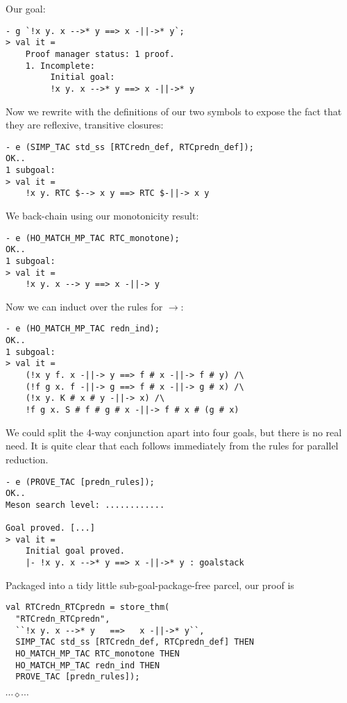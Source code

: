 \documentclass[12pt]{article}
\newcommand{\eos}{\hfill{}$\cdots\diamond\cdots$\hfill{}\vspace{5mm}}
\begin{document}
Our goal:
\begin{session}\begin{verbatim}
- g `!x y. x -->* y ==> x -||->* y`;
> val it =
    Proof manager status: 1 proof.
    1. Incomplete:
         Initial goal:
         !x y. x -->* y ==> x -||->* y
\end{verbatim}\end{session}
Now we rewrite with the definitions of our two symbols to expose the
fact that they are reflexive, transitive closures:
\begin{session}\begin{verbatim}
- e (SIMP_TAC std_ss [RTCredn_def, RTCpredn_def]);
OK..
1 subgoal:
> val it =
    !x y. RTC $--> x y ==> RTC $-||-> x y
\end{verbatim}\end{session}
We back-chain using our monotonicity result:
\begin{session}\begin{verbatim}
- e (HO_MATCH_MP_TAC RTC_monotone);
OK..
1 subgoal:
> val it =
    !x y. x --> y ==> x -||-> y
\end{verbatim}\end{session}
Now we can induct over the rules for $\rightarrow$:
\begin{session}\begin{verbatim}
- e (HO_MATCH_MP_TAC redn_ind);
OK..
1 subgoal:
> val it =
    (!x y f. x -||-> y ==> f # x -||-> f # y) /\
    (!f g x. f -||-> g ==> f # x -||-> g # x) /\
    (!x y. K # x # y -||-> x) /\
    !f g x. S # f # g # x -||-> f # x # (g # x)
\end{verbatim}\end{session}
We could split the 4-way conjunction apart into four goals, but there
is no real need.  It is quite clear that each follows immediately from
the rules for parallel reduction.
\begin{session}\begin{verbatim}
- e (PROVE_TAC [predn_rules]);
OK..
Meson search level: ............

Goal proved. [...]
> val it =
    Initial goal proved.
    |- !x y. x -->* y ==> x -||->* y : goalstack
\end{verbatim}\end{session}
Packaged into a tidy little sub-goal-package-free parcel, our proof is
\begin{session}\begin{verbatim}
val RTCredn_RTCpredn = store_thm(
  "RTCredn_RTCpredn",
  ``!x y. x -->* y   ==>   x -||->* y``,
  SIMP_TAC std_ss [RTCredn_def, RTCpredn_def] THEN
  HO_MATCH_MP_TAC RTC_monotone THEN
  HO_MATCH_MP_TAC redn_ind THEN
  PROVE_TAC [predn_rules]);
\end{verbatim}\end{session}
\eos{}
\end{document}
